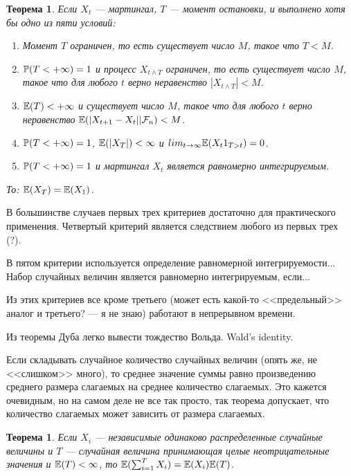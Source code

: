 \documentclass[pdftex,12pt,a4paper]{article}
\numberwithin{equation}{page} %
\newtheorem{theorem}[equation]{Теорема} %
\theoremstyle{definition} %
\theoremstyle{definition}
\theoremstyle{definition}
\theoremstyle{definition}
\begin{document}
\begin{theorem}

Если $X_{t}$ --- мартингал, $T$ --- момент остановки, и выполнено хотя бы одно из пяти условий: 

\begin{enumerate}
\item Момент $T$ ограничен, то есть существует число $M$, такое что $T<M$. 

\item $\P(T<+\infty)=1$ и процесс $X_{t\wedge T}$ ограничен, то есть существует число $M$, такое что для любого $t$ верно неравенство $|X_{t\wedge T}|<M$. 

\item $\E(T)<+\infty$ и существует число $M$, такое что для любого $t$ верно неравенство $\E(|X_{t+1}-X_{t}||\mathcal{F}_{n})<M$.

\item $\P(T<+\infty)=1$, $\E(|X_{T}|)<\infty$ и $lim_{t\to\infty}\E(X_{t}1_{T>t})=0$.

\item $\P(T<+\infty)=1$ и мартингал $X_{t}$ является равномерно интегрируемым.
\end{enumerate}

То: $\E(X_{T})=\E(X_{1})$.
\end{theorem}

В большинстве случаев первых трех критериев достаточно для практического применения.
Четвертый критерий является следствием любого из первых трех (?).

В пятом критерии используется определение равномерной интегрируемости...
Набор случайных величин является равномерно интегрируемым, если...





Из этих критериев все кроме третьего (может есть какой-то <<предельный>> аналог и третьего? --- я не знаю) работают в непрерывном времени.

Из теоремы Дуба легко вывести тождество Вольда. Wald's identity.
 
Если складывать случайное количество случайных величин (опять же, не <<слишком>> много), то среднее значение суммы равно произведению среднего размера слагаемых на среднее количество слагаемых. Это кажется очевидным, но на самом деле не все так просто, так теорема допускает, что количество слагаемых может зависить от размера слагаемых.

\begin{theorem}
Если $X_{i}$ --- независимые одинаково распределенные случайные величины и $T$ --- случайная величина принимающая целые неотрицательные значения и $\E(T)<\infty$, то $\E(\sum_{i=1}^{T}X_{i})=\E(X_{i})\E(T)$.
\end{theorem}
\end{document}

